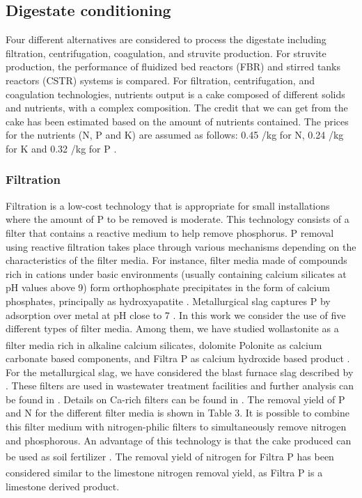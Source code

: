 \begin{refsection}[referencesCh2]
\subsection{Digestate conditioning} \label{section:DigestateConditioning}
Four different alternatives are considered to process the digestate including filtration, centrifugation, coagulation, and struvite production. For struvite production, the performance of fluidized bed reactors (FBR) and stirred tanks reactors (CSTR) systems is compared. For filtration, centrifugation, and coagulation technologies, nutrients output is a cake composed of different solids and nutrients, with a complex composition. The credit that we can get from the cake has been estimated based on the amount of nutrients contained. The prices for the nutrients (N, P and K) are assumed as follows: 0.45 \texteuro/kg for N, 0.24 \texteuro/kg for K and 0.32 \texteuro/kg for P \citep{hernandez2017bio}.

\subsubsection{Filtration}
Filtration is a low-cost technology that is appropriate for small installations where the amount of P to be removed is moderate. This technology consists of a filter that contains a reactive medium to help remove phosphorus. P removal using reactive filtration takes place through various mechanisms depending on the characteristics of the filter media. For instance, filter media made of compounds rich in cations under basic environments (usually containing calcium silicates at pH values above 9) form orthophosphate precipitates in the form of calcium phosphates, principally as hydroxyapatite \citep{pratt2012biologically}. Metallurgical slag captures P by adsorption over metal at pH close to 7 \citep{pratt2012biologically}. In this work we consider the use of five different types of filter media. Among them, we have studied wollastonite as a filter media rich in alkaline calcium silicates, dolomite Polonite\textsuperscript{\textregistered} as calcium carbonate based components, and Filtra P as calcium hydroxide based product \citep{osterberg2012removal, vohla2011filter}. For the metallurgical slag, we have considered the blast furnace slag described by \citet{cucarella2008effect}. These filters are used in wastewater treatment facilities \citep{gustafsson2008phosphate} and further analysis can be found in \citet{shilton2006phosphorus}. Details on Ca-rich filters can be found in \citet{koiv2010phosphorus}. The removal yield of P and N for the different filter media is shown in Table 3. It is possible to combine this filter medium with nitrogen-philic filters to simultaneously remove nitrogen and phosphorous. An advantage of this technology is that the cake produced can be used as soil fertilizer \citep{hylander2006phosphorus}. The removal yield of nitrogen for Filtra P\textsuperscript{\textregistered} has been considered similar to the limestone nitrogen removal yield, as Filtra P\textsuperscript{\textregistered} is a limestone derived product.


\end{refsection}
